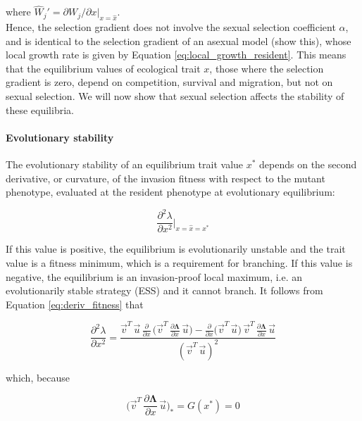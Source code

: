 where $\hat{W}_j' = \partial W_j / \partial x |_{x = \hat{x}}$.\\

Hence, the selection gradient does not involve the sexual selection coefficient $\alpha$, and is identical to the selection gradient of an asexual model (show this), whose local growth rate is given by Equation \ref{eq:local_growth_resident}. This means that the equilibrium values of ecological trait $x$, those where the selection gradient is zero, depend on competition, survival and migration, but not on sexual selection. We will now show that sexual selection affects the stability of these equilibria.

\paragraph{Evolutionary stability} The evolutionary stability of an equilibrium trait value $x^*$ depends on the second derivative, or curvature, of the invasion fitness with respect to the mutant phenotype, evaluated at the resident phenotype at evolutionary equilibrium:

\begin{equation}
    \frac{\partial^2 \lambda}{\partial x^2}\bigg|_{x=\hat{x}=x^*}
\end{equation}

If this value is positive, the equilibrium is evolutionarily unstable and the trait value is a fitness minimum, which is a requirement for branching. If this value is negative, the equilibrium is an invasion-proof local maximum, i.e. an evolutionarily stable strategy (ESS) and it cannot branch. It follows from Equation \ref{eq:deriv_fitness} that

\begin{equation}
    \frac{\partial^2 \lambda}{\partial x^2} = \frac{\overrightarrow{v}^T\,\overrightarrow{u}\,\frac{\partial}{\partial x}\,\big(\overrightarrow{v}^T\,\frac{\partial \pmb{\Lambda}}{\partial x}\,\overrightarrow{u}\big) - \frac{\partial}{\partial x} \big( \overrightarrow{v}^T \, \overrightarrow{u} \big) \, \overrightarrow{v}^T \, \frac{\partial \pmb{\Lambda}}{\partial x}\,\overrightarrow{u}}{(\overrightarrow{v}^T\,\overrightarrow{u})^2}
\end{equation}

which, because

\begin{equation}
    \bigg( \overrightarrow{v}^T\,\frac{
    \partial \pmb \Lambda}{\partial x}\,\overrightarrow{u} \bigg)_* = G(x^*) = 0
\end{equation}

